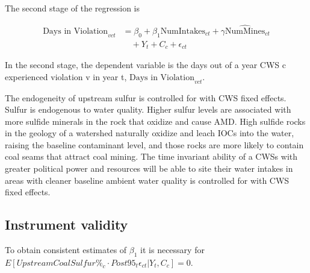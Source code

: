 \documentclass{article}
\begin{document}
The second stage of the regression is

\begin{equation}\label{2ndstage2sls}
\begin{split}
\text{Days in Violation}_{vct} &= \beta_0 + \beta_1\text{NumIntakes}_{ct} + \gamma\widehat{\text{NumMines}}_{ct} \\
&\quad + Y_t + C_c + \epsilon_{ct}
\end{split}
\end{equation}

In the second stage, the dependent variable is the days out of a year CWS c experienced violation v in year t, $\text{Days in Violation}_{vct}$. 

The endogeneity of upstream sulfur is controlled for with CWS fixed effects. Sulfur is endogenous to water quality. Higher sulfur levels are associated with more sulfide minerals in the rock that oxidize and cause AMD. High sulfide rocks in the geology of a watershed naturally oxidize and leach IOCs into the water, raising the baseline contaminant level, and those rocks are more likely to contain coal seams that attract coal mining. The time invariant ability of a CWSs with greater political power and resources will be able to site their water intakes in areas with cleaner baseline ambient water quality is controlled for with CWS fixed effects.

\subsection{Instrument validity}

To obtain consistent estimates of $\beta_1$ it is necessary for $E[UpstreamCoalSulfur\%_c\cdot Post95_t \epsilon_{ct} | Y_t,C_c] = 0$.
\end{document}
